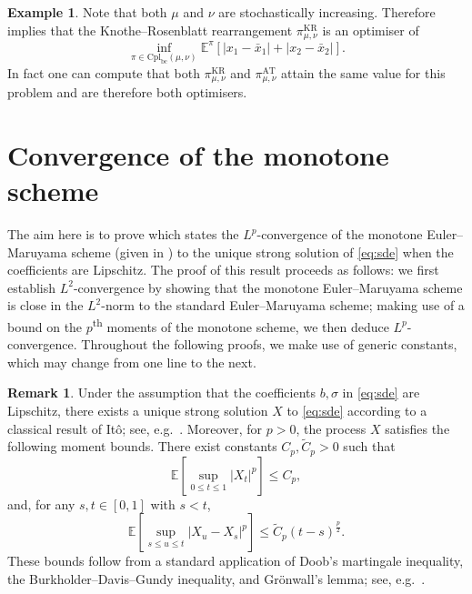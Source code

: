 \documentclass[oneside]{amsart}
\theoremstyle{definition}
\newtheorem{example}[theorem]{Example}
\newtheorem{remark}[theorem]{Remark}
\newcommand{\cpl}{\mathrm{Cpl}}
\newcommand{\cplba}{\cpl_{\mathrm{bc}}}
\newcommand{\kr}{\mathrm{KR}}
\newcommand{\antitone}{\mathrm{AT}}
\def\E{{\mathbb E}}
\numberwithin{equation}{section}
\begin{document}
\begin{example}
			Note that both $\mu$ and $\nu$ are stochastically increasing. Therefore  implies that the Knothe--Rosenblatt rearrangement $\pi^\kr_{\mu, \nu}$ is an optimiser of
			\begin{equation}
				\inf_{\pi \in \cplba(\mu, \nu)}\E^\pi\!\left[|x_1 - \bar x_1| + |x_2 - \bar x_2|\right].
			\end{equation}
			In fact one can compute that both $\pi^\kr_{\mu, \nu}$ and $\pi^\antitone_{\mu, \nu}$ attain the same value for this problem and are therefore both optimisers.
		\end{example}


\appendix

\section{Convergence of the monotone scheme}	\label{app:convergence}

The aim here is to prove  which states the $L^p$-convergence of the monotone Euler--Maruyama scheme (given in ) to the unique strong solution of \eqref{eq:sde} when the coefficients are Lipschitz. 
The proof of this result proceeds as follows: we first establish $L^2$-convergence by showing that the monotone Euler--Maruyama scheme is close in the $L^2$-norm to the standard Euler--Maruyama scheme; making use of a bound on the $p$\textsuperscript{th} moments of the monotone scheme, we then deduce $L^p$-convergence. 
Throughout the following proofs, we make use of generic constants, which may change from one line to the next.

\begin{remark}\label{rem:ito-strong-solution}
	Under the assumption that the coefficients $b, \sigma$ in \eqref{eq:sde} are Lipschitz, there exists a unique strong solution $X$ to \eqref{eq:sde} according to a classical result of It\^o; see, e.g.\ \cite[Proposition 1.9]{ChEn05}. Moreover, for $p > 0$, the process $X$ satisfies the following moment bounds. There exist constants $C_p, \tilde C_p > 0$ such that
	\begin{equation}\label{eq:lp-ito}
		\E \!\left[\sup_{0 \leq t \leq 1}|X_t|^p\right] \leq C_p,
	\end{equation}
	and, for any $s, t \in [0, 1]$ with $s < t$,
	\begin{equation}\label{eq:one-step-error-sde}
		\E \!\left[\sup_{s \leq u \leq t}|X_u - X_s|^p\right] \leq \tilde C_p (t - s)^{\frac p2}.
	\end{equation}
	These bounds follow from a standard application of Doob's martingale inequality, the Burkholder--Davis--Gundy inequality, and Gr\"onwall's lemma; see, e.g.~\cite[Lemma 3.8 and Equation~(3.48)]{GiSk79}.
\end{remark}
\end{document}
